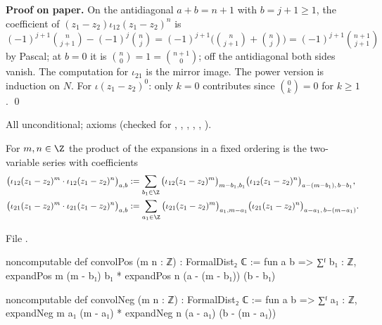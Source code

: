 \textbf{Proof on paper.} On the antidiagonal $a+b = n+1$ with $b = j+1\ge1$, the coefficient of
$(z_1-z_2)\iota_{12}(z_1-z_2)^n$ is $(-1)^{j+1}\binom n{j+1}-(-1)^j\binom nj = (-1)^{j+1}\big(\binom n{j+1}+\binom nj\big) =
(-1)^{j+1}\binom{n+1}{j+1}$ by Pascal; at $b = 0$ it is $\binom n0 = 1 = \binom{n+1}0$; off the antidiagonal both sides
vanish. The computation for $\iota_{21}$ is the mirror image. The power version is induction on $N$. For
$\iota(z_1-z_2)^0$: only $k = 0$ contributes since $\binom0k = 0$ for $k\ge1$. \qed

\begin{status}
All unconditional; axioms  (checked for
, , , ,
, ).
\end{status}

\begin{definition}\label{l01:def:convol}
For $m,n\in\Z$ the product of the expansions in a fixed ordering is the two-variable series with
coefficients
\begin{align*}
  \big(\iota_{12}(z_1-z_2)^m\cdot\iota_{12}(z_1-z_2)^n\big)_{a,b} &:=
  \sum_{b_1\in\Z}\big(\iota_{12}(z_1-z_2)^m\big)_{m-b_1,b_1}\big(\iota_{12}(z_1-z_2)^n\big)_{a-(m-b_1),\,b-b_1},\\
  \big(\iota_{21}(z_1-z_2)^m\cdot\iota_{21}(z_1-z_2)^n\big)_{a,b} &:=
  \sum_{a_1\in\Z}\big(\iota_{21}(z_1-z_2)^m\big)_{a_1,m-a_1}\big(\iota_{21}(z_1-z_2)^n\big)_{a-a_1,\,b-(m-a_1)} .
\end{align*}
\end{definition}

\noindent File .
\begin{leancode}
noncomputable def convolPos (m n : ℤ) : FormalDist₂ ℂ :=
  fun a b => ∑ᶠ b₁ : ℤ, expandPos m (m - b₁) b₁ * expandPos n (a - (m - b₁)) (b - b₁)

noncomputable def convolNeg (m n : ℤ) : FormalDist₂ ℂ :=
  fun a b => ∑ᶠ a₁ : ℤ, expandNeg m a₁ (m - a₁) * expandNeg n (a - a₁) (b - (m - a₁))
\end{leancode}


